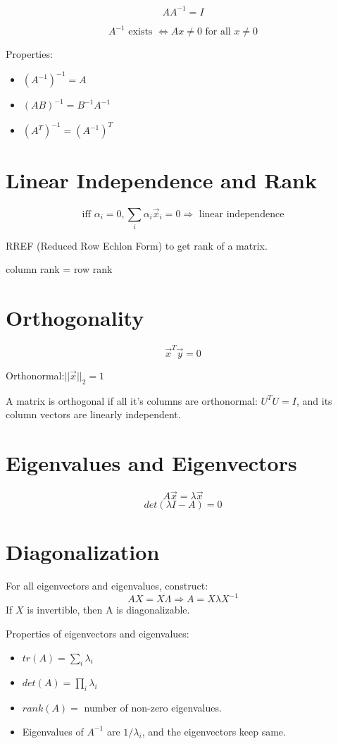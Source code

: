 \documentclass[letterpaper,10pt]{article}
\begin{document}
$$AA^{-1}=I$$

$$A^{-1} \text{ exists } \Leftrightarrow Ax\neq 0 \text{ for all } x\neq 0$$

Properties:
\begin{itemize}
	\item $(A^{-1})^{-1}=A$
	\item $(AB)^{-1}=B^{-1}A^{-1}$
	\item $(A^T)^{-1}=(A^{-1})^T$
\end{itemize}

\section{Linear Independence and Rank}

$$\text{iff }\alpha_i=0, \sum_{i} \alpha_i \vec{x}_i = 0 \Rightarrow \text{ linear independence}$$

RREF (Reduced Row Echlon Form) to get rank of a matrix.

column rank = row rank

\section{Orthogonality}

$$\vec{x}^T\vec{y}=0$$

Orthonormal:$||\vec{x}||_2=1$

A matrix is orthogonal if all it's columns are orthonormal: $U^TU=I$, and its column vectors are linearly independent.

\section{Eigenvalues and Eigenvectors}

$$A\vec{x}=\lambda\vec{x}$$
$$det(\lambda I - A)=0$$

\section{Diagonalization}

For all eigenvectors and eigenvalues, construct:
$$AX=X\Lambda \Rightarrow A=X\lambda X^{-1}$$
If $X$ is invertible, then A is diagonalizable.

Properties of eigenvectors and eigenvalues:
\begin{itemize}
	\item $tr(A)=\sum_i{\lambda_i}$
	\item $det(A)=\prod_i{\lambda_i}$
	\item $rank(A)=$ number of non-zero eigenvalues.
	\item Eigenvalues of $A^{-1}$ are $1/\lambda_i$, and the eigenvectors keep same.
\end{itemize}
\end{document}
